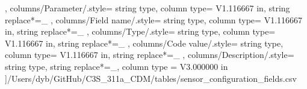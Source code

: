 \begin{landscape}
{        },
    columns/Parameter/.style={
            string type, 
            column type= V{1.116667 in}, 
            string replace*={_}{}
        },
    columns/Field name/.style={
            string type, 
            column type= V{1.116667 in}, 
            string replace*={_}{}
        },
    columns/Type/.style={
            string type, 
            column type= V{1.116667 in}, 
            string replace*={_}{}
        },
    columns/Code value/.style={
            string type, 
            column type= V{1.116667 in}, 
            string replace*={_}{}
        },
    columns/Description/.style={
            string type, 
            string replace*={_}{},
            column type = V{3.000000 in}
        }
    ]{/Users/dyb/GitHub/C3S_311a_CDM/tables/sensor_configuration_fields.csv}
\end{landscape}
